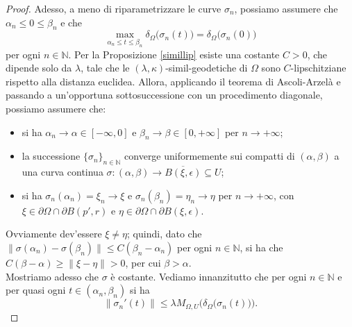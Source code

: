 \begin{proof}
    Adesso, a meno di riparametrizzare le curve $\sigma_n$, possiamo assumere che $\alpha_n\le 0\le\beta_n$ e che
    $$\max_{\alpha_n\le t\le \beta_n}\delta_\Omega\big(\sigma_n(t)\big)=\delta_\Omega\big(\sigma_n(0)\big)$$
    per ogni $n\in\mathbb{N}$. Per la Proposizione \ref{simillip} esiste una costante $C>0$, che dipende solo da $\lambda$, tale che le $(\lambda,\kappa)$-simil-geodetiche di $\Omega$ sono $C$-lipschitziane rispetto alla distanza euclidea. Allora, applicando il teorema di Ascoli-Arzelà e passando a un'opportuna sottosuccessione con un procedimento diagonale, possiamo assumere che:
    \begin{itemize}
        \item si ha $\alpha_n\longrightarrow\alpha\in[-\infty,0]$ e $\beta_n\longrightarrow\beta\in[0,+\infty]$ per $n\longrightarrow+\infty$;
        \item la successione $\{\sigma_n\}_{n\in\mathbb{N}}$ converge uniformemente sui compatti di $(\alpha,\beta)$ a una curva continua $\sigma:(\alpha,\beta)\longrightarrow \overline{B(\xi,\epsilon)}\subseteq U$;
        \item si ha $\sigma_n(\alpha_n)=\xi_n\longrightarrow\xi$ e $\sigma_n(\beta_n)=\eta_n\longrightarrow\eta$ per $n\longrightarrow+\infty$, con $\xi\in\partial\Omega\cap\partial B(p',r)$ e $\eta\in\partial\Omega\cap\partial B(\xi,\epsilon)$.
    \end{itemize}

    Ovviamente dev'essere $\xi\not=\eta$; quindi, dato che $\|\sigma(\alpha_n)-\sigma(\beta_n)\| \le C(\beta_n-\alpha_n)$ per ogni $n\in\mathbb{N}$, si ha che $C(\beta-\alpha)\ge\|\xi-\eta\|>0$, per cui $\beta>\alpha$. \\

    Mostriamo adesso che $\sigma$ è costante. Vediamo innanzitutto che per ogni $n\in\mathbb{N}$ e per quasi ogni $t\in(\alpha_n,\beta_n)$ si ha
    $$\|\sigma_n'(t)\| \le \lambda M_{\Omega,U}\Big(\delta_\Omega\big(\sigma_n(t)\big)\Big).$$
    

\end{proof}
